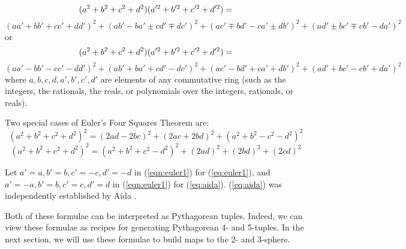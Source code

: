 \begin{theorem}

\[
(a^2 + b^2 + c^2 + d^2) (a'^2 + b'^2 + c'^2 + d'^2) = \hfill
\]
\begin{equation}
\label{eqn:euler1}
(aa' + bb' + cc' + dd')^2 +
(ab' - ba' \pm cd' \mp dc')^2 +
(ac' \mp bd' - ca' \pm db')^2 +
(ad' \pm bc' \mp cb' - da')^2
\end{equation}
or
%
%
\[
(a^2 + b^2 + c^2 + d^2) (a'^2 + b'^2 + c'^2 + d'^2) = \hfill
\]
\begin{equation}
\label{eqn:euler2}
(aa' - bb' - cc' - dd')^2 +
(ab' + ba' + cd' - dc')^2 +
(ac' - bd' + ca' + db')^2 +
(ad' + bc' - cb' + da')^2
\end{equation}
where $a,b,c,d,a',b',c',d'$ are elements of any commutative ring 
(such as the integers, the rationals, the reals, or 
polynomials over the integers, rationals, or reals).
\end{theorem}

\begin{corollary}
\label{cor:specialEuler}
Two special cases of Euler's Four Squares Theorem are: 
\begin{equation}
\label{eq:euler1}
(a^2 + b^2 + c^2 + d^2)^2 = 
(2ad-2bc)^2 + (2ac+2bd)^2 + (a^2 + b^2 - c^2 - d^2)^2
\end{equation}
%
\begin{equation}
\label{eq:aida}
(a^2 + b^2 + c^2 + d^2)^2 = 
(a^2 + b^2 + c^2 - d^2)^2 + (2ad)^2 + (2bd)^2 + (2cd)^2
\end{equation}
\end{corollary}
\prf
Let $a'=a, b'=b, c'=-c, d'=-d$ in (\ref{eqn:euler1}) for (\ref{eq:euler1}),
and $a'=-a, b'=b, c'=c, d'=d$ in (\ref{eqn:euler1}) for (\ref{eq:aida}).
(\ref{eq:aida}) was independently established by Aida \cite{dickson52}. %
\QED

Both of these formulae can be interpreted as Pythagorean tuples.
Indeed, we can view these formulae as recipes for generating
Pythagorean 4- and 5-tuples.
In the next section, we will use these formulae to build maps to the 2-
and 3-sphere.

